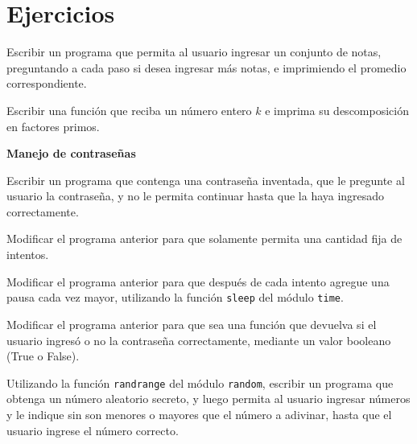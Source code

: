 \newpage
\section{Ejercicios}

\begin{ejercicio}
Escribir un programa que permita al usuario ingresar un conjunto de notas,
preguntando a cada paso si desea ingresar más notas, e imprimiendo el
promedio correspondiente.
\end{ejercicio}

\begin{ejercicio}
Escribir una función que reciba un número entero $k$ e imprima su
descomposición en factores primos.
\end{ejercicio}

\begin{ejercicio}
{\bf Manejo de contraseñas}
\begin{partes}
    \item Escribir un programa que contenga una contraseña inventada, que le
pregunte al usuario la contraseña, y no le permita continuar hasta que la
haya ingresado correctamente.
    \item Modificar el programa anterior para que solamente permita una
cantidad fija de intentos.
    \item Modificar el programa anterior para que después de cada intento
agregue una pausa cada vez mayor, utilizando la función \verb!sleep! del
módulo \verb!time!.
    \item Modificar el programa anterior para que sea una función que devuelva
si el usuario ingresó o no la contraseña correctamente, mediante un valor
booleano (True o False).
\end{partes}
\end{ejercicio}


\begin{ejercicio}
Utilizando la función \verb!randrange! del módulo \verb!random!,
escribir un programa que obtenga un número aleatorio secreto, y luego
permita al usuario ingresar números y le indique sin son menores o mayores
que el número a adivinar, hasta que el usuario ingrese el número correcto.
\end{ejercicio}


